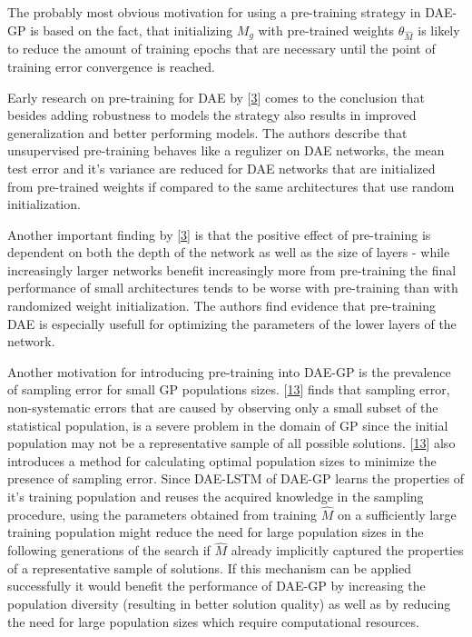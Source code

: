 \documentclass[
  11pt,
]{article}
\begin{document}
The probably most obvious motivation for using a pre-training strategy in DAE-GP is based on the fact, that initializing \(M_g\) with pre-trained weights \(\theta_{\hat{M}}\) is likely to reduce the amount of training epochs that are necessary until the point of training error convergence is reached.

Early research on pre-training for DAE by {[}\protect\hyperlink{ref-pmlr-v5-erhan09a}{3}{]} comes to the conclusion that besides adding robustness to models the strategy also results in improved generalization and better performing models. The authors describe that unsupervised pre-training behaves like a regulizer on DAE networks, the mean test error and it's variance are reduced for DAE networks that are initialized from pre-trained weights if compared to the same architectures that use random initialization.

Another important finding by {[}\protect\hyperlink{ref-pmlr-v5-erhan09a}{3}{]} is that the positive effect of pre-training is dependent on both the depth of the network as well as the size of layers - while increasingly larger networks benefit increasingly more from pre-training the final performance of small architectures tends to be worse with pre-training than with randomized weight initialization.
The authors find evidence that pre-training DAE is especially usefull for optimizing the parameters of the lower layers of the network.

Another motivation for introducing pre-training into DAE-GP is the prevalence of sampling error for small GP populations sizes.
{[}\protect\hyperlink{ref-sampling_err_gp}{13}{]} finds that sampling error, non-systematic errors that are caused by observing only a small subset of the statistical population, is a severe problem in the domain of GP since the initial population may not be a representative sample of all possible solutions.
{[}\protect\hyperlink{ref-sampling_err_gp}{13}{]} also introduces a method for calculating optimal population sizes to minimize the presence of sampling error.
Since DAE-LSTM of DAE-GP learns the properties of it's training population and reuses the acquired knowledge in the sampling procedure, using the parameters obtained from training \(\hat{M}\) on a sufficiently large training population might reduce the need for large population sizes in the following generations of the search if \(\hat{M}\) already implicitly captured the properties of a representative sample of solutions.
If this mechanism can be applied successfully it would benefit the performance of DAE-GP by increasing the population diversity (resulting in better solution quality) as well as by reducing the need for large population sizes which require computational resources.
\end{document}
